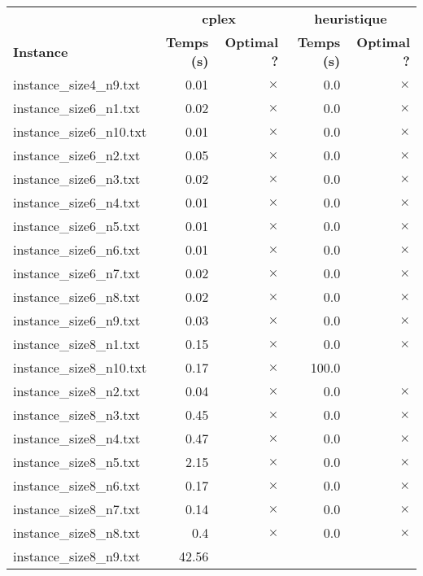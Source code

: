 \documentclass{article}
\begin{document}
\newpage
\begin{center}
\renewcommand{\arraystretch}{1.4}
 \begin{tabular}{lrrrr}
	\hline
 & \multicolumn{2}{c}{\textbf{cplex}} & \multicolumn{2}{c}{\textbf{heuristique}}\\
\textbf{Instance}  & \textbf{Temps (s)} & \textbf{Optimal ?}  & \textbf{Temps (s)} & \textbf{Optimal ?} \\\hline

instance\_size4\_n9.txt & 0.01 & 
$\times$
 & 0.0 & 
$\times$
\\
instance\_size6\_n1.txt & 0.02 & 
$\times$
 & 0.0 & 
$\times$
\\
instance\_size6\_n10.txt & 0.01 & 
$\times$
 & 0.0 & 
$\times$
\\
instance\_size6\_n2.txt & 0.05 & 
$\times$
 & 0.0 & 
$\times$
\\
instance\_size6\_n3.txt & 0.02 & 
$\times$
 & 0.0 & 
$\times$
\\
instance\_size6\_n4.txt & 0.01 & 
$\times$
 & 0.0 & 
$\times$
\\
instance\_size6\_n5.txt & 0.01 & 
$\times$
 & 0.0 & 
$\times$
\\
instance\_size6\_n6.txt & 0.01 & 
$\times$
 & 0.0 & 
$\times$
\\
instance\_size6\_n7.txt & 0.02 & 
$\times$
 & 0.0 & 
$\times$
\\
instance\_size6\_n8.txt & 0.02 & 
$\times$
 & 0.0 & 
$\times$
\\
instance\_size6\_n9.txt & 0.03 & 
$\times$
 & 0.0 & 
$\times$
\\
instance\_size8\_n1.txt & 0.15 & 
$\times$
 & 0.0 & 
$\times$
\\
instance\_size8\_n10.txt & 0.17 & 
$\times$
 & 100.0 & 
\\
instance\_size8\_n2.txt & 0.04 & 
$\times$
 & 0.0 & 
$\times$
\\
instance\_size8\_n3.txt & 0.45 & 
$\times$
 & 0.0 & 
$\times$
\\
instance\_size8\_n4.txt & 0.47 & 
$\times$
 & 0.0 & 
$\times$
\\
instance\_size8\_n5.txt & 2.15 & 
$\times$
 & 0.0 & 
$\times$
\\
instance\_size8\_n6.txt & 0.17 & 
$\times$
 & 0.0 & 
$\times$
\\
instance\_size8\_n7.txt & 0.14 & 
$\times$
 & 0.0 & 
$\times$
\\
instance\_size8\_n8.txt & 0.4 & 
$\times$
 & 0.0 & 
$\times$
\\
instance\_size8\_n9.txt & 42.56 & 

\end{tabular}
\end{center}
\end{document}
